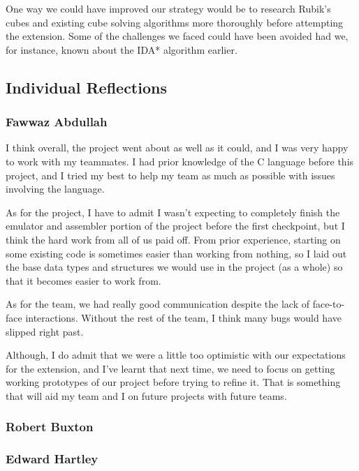 \documentclass[8pt]{article}
\begin{document}
One way we could have improved our strategy would be to research Rubik's cubes and
existing cube solving algorithms more thoroughly before attempting the extension.
Some of the challenges we faced could have been avoided had we, for instance, known about
the IDA* algorithm earlier.

\subsection{Individual Reflections}

\subsubsection{Fawwaz Abdullah}

I think overall, the project went about as well as it could, and I was very happy to work with my teammates.
I had prior knowledge of the C language before this project, and I tried my best to help my team as much as possible with issues involving the language.

As for the project, I have to admit I wasn't expecting to completely finish the emulator and assembler portion of the project before the first checkpoint, but I think the hard work from all of us paid off.
From prior experience, starting on some existing code is sometimes easier than working from nothing, so I laid out the base data types and structures we would use in the project (as a whole) so that it becomes easier to work from.

As for the team, we had really good communication despite the lack of face-to-face interactions.
Without the rest of the team, I think many bugs would have slipped right past.

Although, I do admit that we were a little too optimistic with our expectations for the extension, and I've learnt that next time, we need to focus on getting working prototypes of our project before trying to refine it.
That is something that will aid my team and I on future projects with future teams.

\subsubsection{Robert Buxton}



\subsubsection{Edward Hartley}
\end{document}
